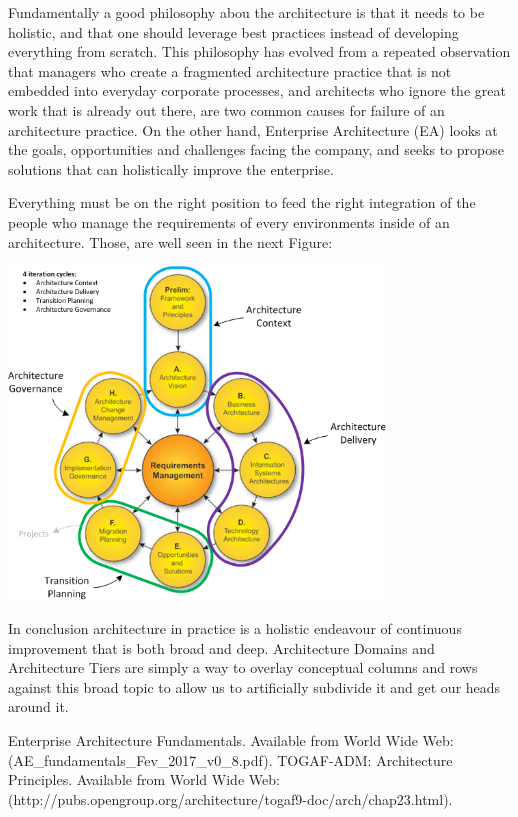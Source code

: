 \documentclass[a4paper,12pt]{texDoc}
\begin{document}
Fundamentally a good philosophy abou the architecture is that it needs to be holistic, and that one should leverage best practices instead of developing everything from scratch. This philosophy has evolved from a repeated observation that managers who create a fragmented architecture practice that is not embedded into everyday corporate processes, and architects who ignore the great work that is already out there, are two common causes for failure of an architecture practice. On the other hand, Enterprise Architecture (EA) looks at the goals, opportunities and challenges facing the company, and seeks to propose solutions that can holistically improve the enterprise.

Everything must be on the right position to feed the right integration of the people who manage the requirements of every environments inside of an architecture. Those, are well seen in the next Figure:

\begin{center}
\includegraphics[width=0.75\textwidth]{togaf-adm.png}
\end{center}

In conclusion architecture in practice is a holistic endeavour of continuous improvement that is both broad and deep. Architecture Domains and Architecture Tiers are simply a way to overlay conceptual columns and rows against this broad topic to allow us to artificially subdivide it and get our heads around it.

\break



\begin{thebibliography}{9}
  Enterprise Architecture Fundamentals. Available from World Wide Web: (AE\_fundamentals\_Fev\_2017\_v0\_8.pdf).
  TOGAF-ADM: Architecture Principles. Available from World Wide Web: (http://pubs.opengroup.org/architecture/togaf9-doc/arch/chap23.html).
\end{thebibliography}

\end{document}

